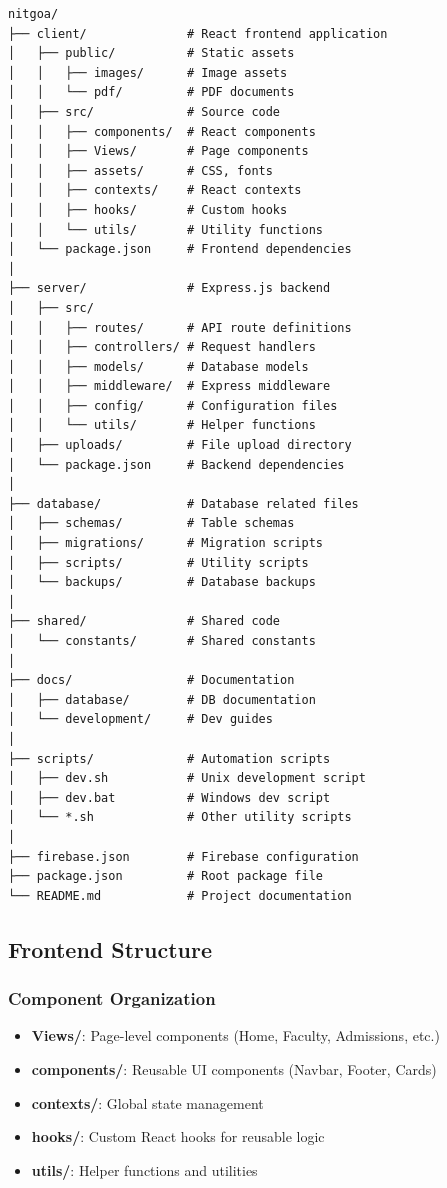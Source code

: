 \documentclass[12pt,a4paper]{report}
\begin{document}
\begin{lstlisting}[caption=Monorepo Directory Structure]
nitgoa/
├── client/              # React frontend application
│   ├── public/          # Static assets
│   │   ├── images/      # Image assets
│   │   └── pdf/         # PDF documents
│   ├── src/             # Source code
│   │   ├── components/  # React components
│   │   ├── Views/       # Page components
│   │   ├── assets/      # CSS, fonts
│   │   ├── contexts/    # React contexts
│   │   ├── hooks/       # Custom hooks
│   │   └── utils/       # Utility functions
│   └── package.json     # Frontend dependencies
│
├── server/              # Express.js backend
│   ├── src/
│   │   ├── routes/      # API route definitions
│   │   ├── controllers/ # Request handlers
│   │   ├── models/      # Database models
│   │   ├── middleware/  # Express middleware
│   │   ├── config/      # Configuration files
│   │   └── utils/       # Helper functions
│   ├── uploads/         # File upload directory
│   └── package.json     # Backend dependencies
│
├── database/            # Database related files
│   ├── schemas/         # Table schemas
│   ├── migrations/      # Migration scripts
│   ├── scripts/         # Utility scripts
│   └── backups/         # Database backups
│
├── shared/              # Shared code
│   └── constants/       # Shared constants
│
├── docs/                # Documentation
│   ├── database/        # DB documentation
│   └── development/     # Dev guides
│
├── scripts/             # Automation scripts
│   ├── dev.sh           # Unix development script
│   ├── dev.bat          # Windows dev script
│   └── *.sh             # Other utility scripts
│
├── firebase.json        # Firebase configuration
├── package.json         # Root package file
└── README.md            # Project documentation
\end{lstlisting}

\subsection*{Frontend Structure}

\subsubsection*{Component Organization}
\begin{itemize}
    \item \textbf{Views/}: Page-level components (Home, Faculty, Admissions, etc.)
    \item \textbf{components/}: Reusable UI components (Navbar, Footer, Cards)
    \item \textbf{contexts/}: Global state management
    \item \textbf{hooks/}: Custom React hooks for reusable logic
    \item \textbf{utils/}: Helper functions and utilities
\end{itemize}
\end{document}
